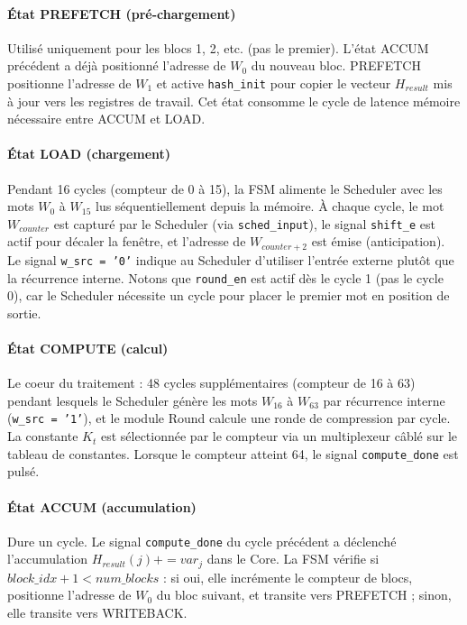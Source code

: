 \paragraph{État PREFETCH (pré-chargement)} Utilisé uniquement pour les blocs 1, 2, etc. (pas le premier). L'état ACCUM précédent a déjà positionné l'adresse de $W_0$ du nouveau bloc. PREFETCH positionne l'adresse de $W_1$ et active \texttt{hash\_init} pour copier le vecteur $H_{result}$ mis à jour vers les registres de travail. Cet état consomme le cycle de latence mémoire nécessaire entre ACCUM et LOAD.

\paragraph{État LOAD (chargement)} Pendant 16 cycles (compteur de 0 à 15), la FSM alimente le Scheduler avec les mots $W_0$ à $W_{15}$ lus séquentiellement depuis la mémoire. À chaque cycle, le mot $W_{counter}$ est capturé par le Scheduler (via \texttt{sched\_input}), le signal \texttt{shift\_e} est actif pour décaler la fenêtre, et l'adresse de $W_{counter+2}$ est émise (anticipation). Le signal \texttt{w\_src = '0'} indique au Scheduler d'utiliser l'entrée externe plutôt que la récurrence interne. Notons que \texttt{round\_en} est actif dès le cycle 1 (pas le cycle 0), car le Scheduler nécessite un cycle pour placer le premier mot en position de sortie.

\paragraph{État COMPUTE (calcul)} Le coeur du traitement : 48 cycles supplémentaires (compteur de 16 à 63) pendant lesquels le Scheduler génère les mots $W_{16}$ à $W_{63}$ par récurrence interne (\texttt{w\_src = '1'}), et le module Round calcule une ronde de compression par cycle. La constante $K_t$ est sélectionnée par le compteur via un multiplexeur câblé sur le tableau de constantes. Lorsque le compteur atteint 64, le signal \texttt{compute\_done} est pulsé.

\paragraph{État ACCUM (accumulation)} Dure un cycle. Le signal \texttt{compute\_done} du cycle précédent a déclenché l'accumulation $H_{result}(j) += var_j$ dans le Core. La FSM vérifie si $block\_idx + 1 < num\_blocks$ : si oui, elle incrémente le compteur de blocs, positionne l'adresse de $W_0$ du bloc suivant, et transite vers PREFETCH ; sinon, elle transite vers WRITEBACK.

